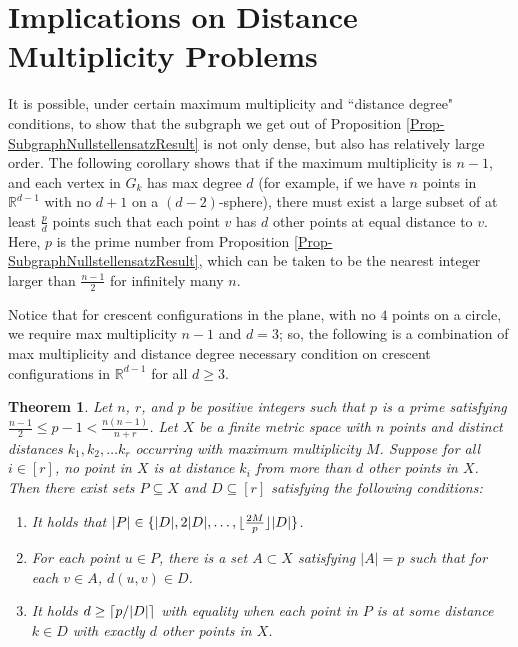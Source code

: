 \documentclass[12pt]{article}
\newcommand{\R}{\mathbb{R}}
\DeclarePairedDelimiter\ceil{\lceil}{\rceil}
\DeclarePairedDelimiter\floor{\lfloor}{\rfloor}
\newtheorem{thm}{Theorem}[section] %
\theoremstyle{definition}
\begin{document}
	\section{Implications on Distance Multiplicity Problems}
	
	It is possible, under certain maximum multiplicity and ``distance degree" conditions, to show that the subgraph we get out of Proposition \ref{Prop-SubgraphNullstellensatzResult} is not only dense, but also has relatively large order.  The following corollary shows that if the maximum multiplicity is $n-1$, and each vertex in $G_k$ has max degree $d$ (for example, if we have $n$ points in $\R^{d-1}$ with no $d+1$ on a $(d-2)$-sphere), there must exist a large subset of at least $\tfrac{p}{d}$ points such that each point $v$ has $d$ other points at equal distance to $v$.  Here, $p$ is the prime number from Proposition \ref{Prop-SubgraphNullstellensatzResult}, which can be taken to be the nearest integer larger than $\tfrac{n-1}{2}$ for infinitely many $n$.  
	
	Notice that for crescent configurations in the plane, with no $4$ points on a circle, we require max multiplicity $n-1$ and $d = 3$; so, the following is a combination of max multiplicity and distance degree necessary condition on crescent configurations in $\R^{d-1}$ for all $d \geq 3$.
	
	\begin{thm}\label{Thm-SingleSetTheorem}
		Let $n$, $r$, and $p$ be positive integers such that $p$ is a prime satisfying $\tfrac{n-1}{2} \leq p-1 < \tfrac{n(n-1)}{n+r}$.  Let $X$ be a finite metric space with $n$ points and distinct distances $k_1, k_2, \ldots k_r$ occurring with maximum multiplicity $M$.  Suppose for all $i \in [r]$, no point in $X$ is at distance $k_i$ from more than $d$ other points in $X$.  Then there exist sets $P \subseteq X$ and $D \subseteq [r]$ satisfying the following conditions:
		\begin{enumerate}
			\item It holds that $|P| \in \{|D|, 2|D|, \ldots, \floor{\tfrac{2M}{p}}|D|\}$.
			\item For each point $u \in P$, there is a set $A \subset X$ satisfying $|A| = p$ such that for each $v \in A$, $d(u,v) \in D$.
			\item It holds $d \geq \ceil{p/|D|}$ with equality when each point in $P$ is at some distance $k \in D$ with exactly $d$ other points in $X$.
		\end{enumerate}
	\end{thm}
	
\end{document}
